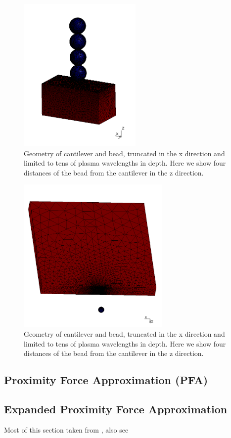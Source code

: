 \documentclass[11pt]{article}
\begin{document}
\begin{figure}[!h]
\centering
\includegraphics[height=3in]{geometry}
\caption{Geometry of cantilever and bead, truncated in the x direction and limited to tens of plasma wavelengths in depth. Here we show four distances of the bead from the cantilever in the z direction.}\label{fig:geo}
\end{figure}

\begin{figure}[!h]
\centering
\includegraphics[height=3in]{Bead_positions}
\caption{Geometry of cantilever and bead, truncated in the x direction and limited to tens of plasma wavelengths in depth. Here we show four distances of the bead from the cantilever in the z direction.}\label{fig:geo}
\end{figure}

\subsection{Proximity Force Approximation (PFA)}

\subsection{Expanded Proximity Force Approximation}
Most of this section taken from \citet{Dexp}, also see \citet{Bimonte12}
\end{document}

